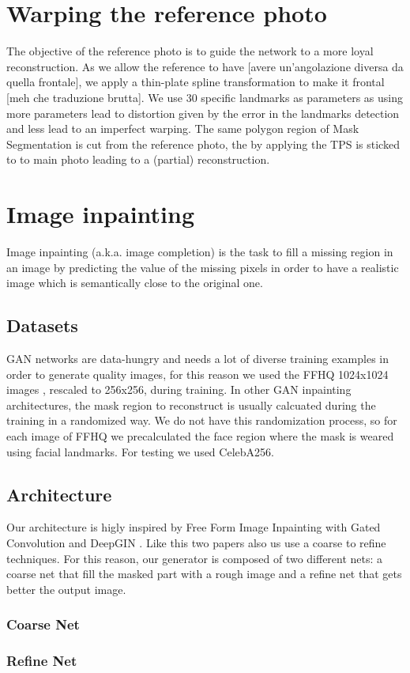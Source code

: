 \documentclass[10pt,twocolumn,letterpaper]{article}
\begin{document}
\section{Warping the reference photo}
The objective of the reference photo is to guide the network to a more loyal
reconstruction. As we allow the reference to have [avere un'angolazione diversa
da quella frontale], we apply a thin-plate spline transformation to make it frontal
[meh che traduzione brutta]. We use 30 specific landmarks as parameters as using
more parameters lead to distortion given by the error in the landmarks detection
and less lead to an imperfect warping. The same polygon region of Mask
Segmentation is cut from the reference photo, the by applying the TPS is sticked
to to main photo leading to a (partial) reconstruction.

\section{Image inpainting}

Image inpainting (a.k.a. image completion) is the task to fill a missing region
in an image by predicting the value of the missing pixels in order to have a
realistic image which is semantically close to the original one.
\subsection{Datasets}
GAN networks are data-hungry and needs a lot of diverse training examples in
order to generate quality images, for this reason we used the FFHQ 1024x1024
images \cite{karras2019style}, rescaled to 256x256, during training.  In other GAN inpainting
architectures, the mask region to reconstruct is usually calcuated during the
training in a randomized way.  We do not have this randomization process, so for
each image of FFHQ we precalculated the face region where the mask is weared
using facial landmarks.  For testing we used CelebA256.

\subsection{Architecture}
Our architecture is higly inspired by Free Form Image Inpainting with Gated
Convolution \cite{yu2019free} and DeepGIN \cite{li2020deepgin}. Like this two papers also us use a coarse to refine techniques.
For this reason, our generator is composed of two different nets: a coarse net that fill the masked part with a rough image and a refine net that gets better the output image.
\subsubsection{Coarse Net}
\subsubsection{Refine Net} 

{\small


}
\end{document}
